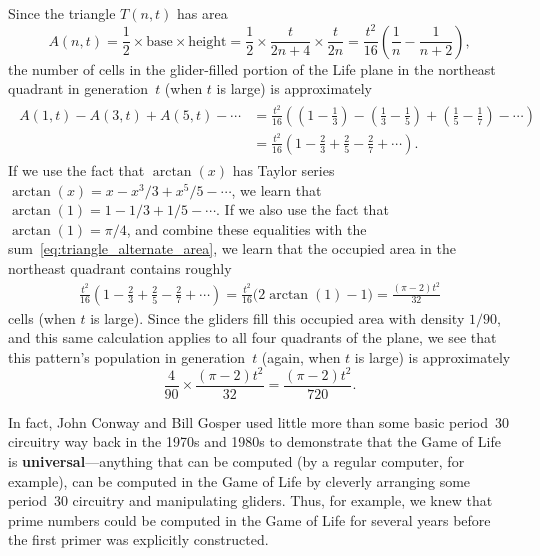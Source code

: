 \begin{itemize}
	Since the triangle $T(n,t)$ has area
	\[
		A(n,t) = \frac{1}{2} \times \text{base} \times \text{height} = \frac{1}{2} \times \frac{t}{2n + 4} \times \frac{t}{2n} = \frac{t^2}{16} \left(\frac{1}{n} - \frac{1}{n+2}\right),
	\]
	the number of cells in the glider-filled portion of the Life plane in the northeast quadrant in generation~$t$ (when $t$ is large) is approximately
	\begin{align}\begin{split}\label{eq:triangle_alternate_area}
		A(1,t) - A(3,t) + A(5,t) - \cdots & = \frac{t^2}{16} \left( \left(1 - \frac{1}{3}\right) - \left(\frac{1}{3} - \frac{1}{5}\right) + \left(\frac{1}{5} - \frac{1}{7}\right) - \cdots\right) \\
		& = \frac{t^2}{16} \left( 1 - \frac{2}{3} + \frac{2}{5} - \frac{2}{7} + \cdots\right).
	\end{split}\end{align}
	If we use the fact that $\arctan(x)$ has Taylor series $\arctan(x) = x - x^3/3 + x^5/5 - \cdots$, we learn that $\arctan(1) = 1 - 1/3 + 1/5 - \cdots$. If we also use the fact that $\arctan(1) = \pi/4$, and combine these equalities with the sum~\eqref{eq:triangle_alternate_area}, we learn that the occupied area in the northeast quadrant contains roughly
	\begin{align*}
		\frac{t^2}{16} \left( 1 - \frac{2}{3} + \frac{2}{5} - \frac{2}{7} + \cdots\right) = \frac{t^2}{16}\big( 2\arctan(1) - 1\big) = \frac{(\pi-2)t^2}{32}
	\end{align*}
	cells (when $t$ is large). Since the gliders fill this occupied area with density $1/90$, and this same calculation applies to all four quadrants of the plane, we see that this pattern's population in generation~$t$ (again, when $t$ is large) is approximately
	\[
		\frac{4}{90} \times \frac{(\pi-2)t^2}{32} = \frac{(\pi-2)t^2}{720}.
	\]
\end{itemize}

In fact, John Conway and Bill Gosper used little more than some basic period~$30$ circuitry way back in the 1970s and 1980s \cite[Chapter~25]{BCG82} to demonstrate that the Game of Life is \textbf{universal}---anything that can be computed (by a regular computer, for example), can be computed in the Game of Life by cleverly arranging some period~$30$ circuitry and manipulating gliders. Thus, for example, we knew that prime numbers could be computed in the Game of Life for several years before the first primer was explicitly constructed.

